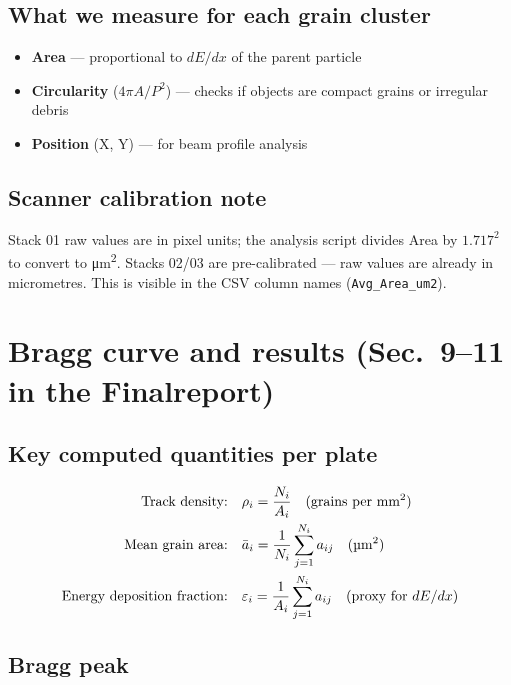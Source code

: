 \documentclass[12pt,a4paper]{article}
\begin{document}
\subsection{What we measure for each grain cluster}

\begin{itemize}
  \item \textbf{Area} --- proportional to $dE/dx$ of the parent particle
  \item \textbf{Circularity} ($4\pi A/P^2$) --- checks if objects are
        compact grains or irregular debris
  \item \textbf{Position} (X, Y) --- for beam profile analysis
\end{itemize}

\subsection{Scanner calibration note}

Stack 01 raw values are in pixel units; the analysis script divides
Area by $1.717^2$ to convert to \si{\micro\meter\squared}.
Stacks 02/03 are pre-calibrated --- raw values are already in
micrometres. This is visible in the CSV column names
(\texttt{Avg\_Area\_um2}).

\section{Bragg curve and results (Sec.~9--11 in the Finalreport)}

\subsection{Key computed quantities per plate}

\begin{align}
\text{Track density:}\quad &
\rho_i = \frac{N_i}{A_i} \quad \text{(grains per mm\textsuperscript{2})}\\
\text{Mean grain area:}\quad &
\bar{a}_i = \frac{1}{N_i}\sum_{j=1}^{N_i} a_{ij} \quad
\text{(\si{\micro\meter\squared})}\\
\text{Energy deposition fraction:}\quad &
\varepsilon_i = \frac{1}{A_i}\sum_{j=1}^{N_i} a_{ij}
\quad \text{(proxy for $dE/dx$)}
\end{align}

\subsection{Bragg peak}
\end{document}
